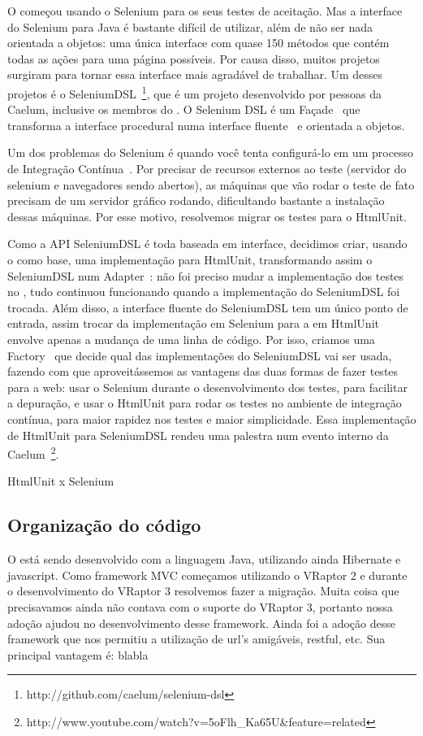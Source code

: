 O \calopsita começou usando o Selenium para os seus testes de aceitação. Mas a interface do Selenium para Java é bastante
difícil de utilizar, além de não ser nada orientada a objetos: uma única interface com quase 150 métodos que contém todas
as ações para uma página possíveis. Por causa disso, muitos projetos surgiram para tornar essa interface mais agradável
de trabalhar. Um desses projetos é o SeleniumDSL~\footnote{http://github.com/caelum/selenium-dsl}, que é um projeto 
\opensource desenvolvido por pessoas da Caelum, inclusive os membros do \calopsita. O Selenium DSL é um Façade~\cite{gof}
que transforma a interface procedural numa interface fluente~\cite{dsl} e orientada a objetos.

Um dos problemas do Selenium é quando você tenta configurá-lo em um processo de Integração Contínua~\cite{ci}. Por precisar
de recursos externos ao teste (servidor do selenium e navegadores sendo abertos), as máquinas que vão rodar o teste de fato
precisam de um servidor gráfico rodando, dificultando bastante a instalação dessas máquinas. Por esse motivo, resolvemos
migrar os testes para o HtmlUnit.

Como a API SeleniumDSL é toda baseada em interface, decidimos criar, usando o \calopsita como base, uma implementação para
HtmlUnit, transformando assim o SeleniumDSL num Adapter~\cite{gof}: não foi preciso mudar a implementação dos testes no 
\calopsita, tudo continuou funcionando quando a implementação do SeleniumDSL foi trocada. Além disso, a interface fluente
do SeleniumDSL tem um único ponto de entrada, assim trocar da implementação em Selenium para a em HtmlUnit envolve apenas
a mudança de uma linha de código. Por isso, criamos uma Factory~\cite{gof} que decide qual das implementações do SeleniumDSL
vai ser usada, fazendo com que aproveitássemos as vantagens das duas formas de fazer testes para a web: usar o Selenium 
durante o desenvolvimento dos testes, para facilitar a depuração, e usar o HtmlUnit para rodar os testes no ambiente de
integração contínua, para maior rapidez nos testes e maior simplicidade. Essa implementação de HtmlUnit
para SeleniumDSL rendeu uma palestra num evento interno da Caelum~\footnote{http://www.youtube.com/watch?v=5oFlh\_Ka65U\&feature=related}.

HtmlUnit x Selenium

\subsection{Organização do código}
O \calopsita está sendo desenvolvido com a linguagem Java, utilizando ainda Hibernate e javascript. Como 
framework MVC começamos utilizando o VRaptor 2 e durante o desenvolvimento do VRaptor 3 resolvemos fazer a migração. 
Muita coisa que precisavamos ainda não contava com o suporte do VRaptor 3, portanto nossa adoção ajudou no 
desenvolvimento desse framework. Ainda foi a adoção desse framework que nos permitiu a utilização de url's 
amigáveis, restful, etc. Sua principal vantagem é: blabla

